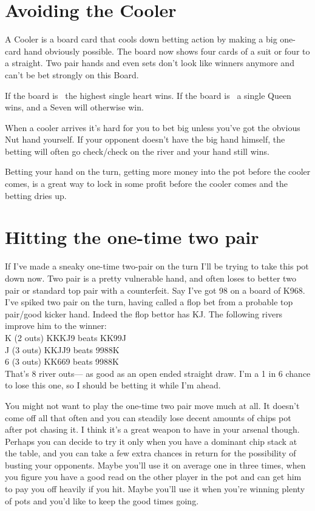 \section{Avoiding the Cooler}

A Cooler is a board card that cools down betting action by making
a big one-card hand obviously possible. The board now shows
four cards of a suit or four to a straight.
Two pair hands and even sets don't look like winners
anymore and can't be bet strongly on this Board.

If the board is \tenh\nineh\sixh\trec\fourh\, the highest single heart wins.
If the board is \Jc\tens\nineh\tred\eigc\, a single Queen wins,
and a Seven will otherwise win.

When a cooler arrives it's hard for you to bet big unless you've got
the obvious Nut hand yourself. If your opponent doesn't have the big
hand himself, the betting will often go check/check on the river
and your hand still wins.

Betting your hand on the turn, getting more money into the pot before
the cooler comes, is a great way to lock in some profit before the
cooler comes and the betting dries up.

\section{Hitting the one-time two pair}

If I've made a sneaky one-time two-pair on the turn I'll be trying to
take this pot down now. Two pair is a pretty vulnerable hand, and
often loses to better two pair or standard top pair with a counterfeit.
Say I've got 98 on a board of K968.  I've spiked two pair on the turn,
having called a flop bet from a probable top pair/good kicker hand.
Indeed the flop bettor has KJ. The following rivers improve him to the
winner: \\
K (2 outs) KKKJ9 beats KK99J \\
J (3 outs) KKJJ9 beats 9988K \\
6 (3 outs) KK669 beats 9988K \\

That's 8 river outs--- as good as an open ended straight draw. I'm a 1 in 6
chance to lose this one, so I should be betting it while I'm ahead.

You might not want to play the one-time two pair move much at all.
It doesn't come off all that often and you can steadily lose decent
amounts of chips pot after pot chasing it. I think it's
a great weapon to have in your arsenal though. Perhaps you
can decide to try it only when you have a dominant chip stack at
the table, and you can take a few extra chances in return for the
possibility of busting your opponents. Maybe you'll use it on average
one in three times, when you figure you have a good read on
the other player in the pot and can get him to pay you off heavily
if you hit. Maybe you'll use it when you're winning plenty of pots
and you'd like to keep the good times going.

